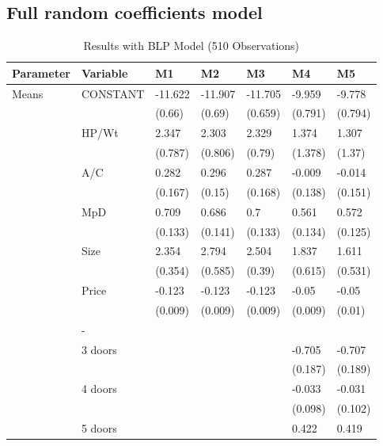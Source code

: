 \documentclass{article}\usepackage[]{graphicx}\usepackage[]{color}
\begin{document}
\subsection{Full random coefficients model}







%

%

%

%

\begin{table}[ht]
\centering
\caption{Results with BLP Model 
 (510 Observations)} 
\label{tbl:blp_results}
\begingroup\footnotesize
\begin{tabular}{lllllll}
  \toprule 
 Parameter & Variable & M1 & M2 & M3 & M4 & M5\\
 \midrule 
 Means & CONSTANT & -11.622 & -11.907 & -11.705 & -9.959 & -9.778 \\ 
   &  & (0.66) & (0.69) & (0.659) & (0.791) & (0.794) \\ 
   & HP/Wt & 2.347 & 2.303 & 2.329 & 1.374 & 1.307 \\ 
   &  & (0.787) & (0.806) & (0.79) & (1.378) & (1.37) \\ 
   & A/C & 0.282 & 0.296 & 0.287 & -0.009 & -0.014 \\ 
   &  & (0.167) & (0.15) & (0.168) & (0.138) & (0.151) \\ 
   & MpD & 0.709 & 0.686 & 0.7 & 0.561 & 0.572 \\ 
   &  & (0.133) & (0.141) & (0.133) & (0.134) & (0.125) \\ 
   & Size & 2.354 & 2.794 & 2.504 & 1.837 & 1.611 \\ 
   &  & (0.354) & (0.585) & (0.39) & (0.615) & (0.531) \\ 
   & Price & -0.123 & -0.123 & -0.123 & -0.05 & -0.05 \\ 
   &  & (0.009) & (0.009) & (0.009) & (0.009) & (0.01) \\ 
   &  -  &  &  &  &  &  \\ 
   & 3 doors &  &  &  & -0.705 & -0.707 \\ 
   &  &  &  &  & (0.187) & (0.189) \\ 
   & 4 doors &  &  &  & -0.033 & -0.031 \\ 
   &  &  &  &  & (0.098) & (0.102) \\ 
   & 5 doors &  &  &  & 0.422 & 0.419 \\ 

\end{tabular}
\end{table}
\end{document}
